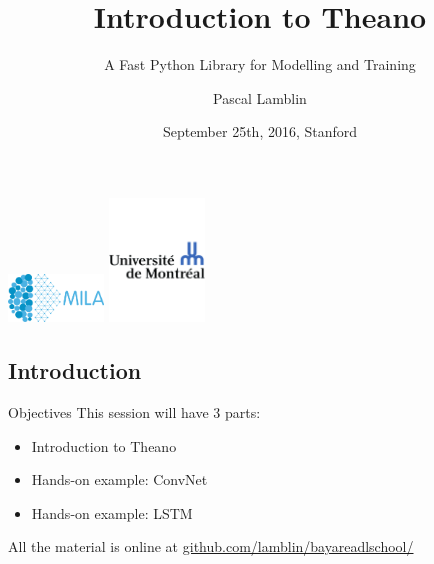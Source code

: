 \documentclass[a4paper,9pt]{beamer}
\title[Intro to Theano]{Introduction to Theano}
\subtitle{A Fast Python Library for Modelling and Training}
\author[MILA]{Pascal Lamblin}
\institute{%
Montreal Institute for Learning Algorithms (MILA)\\
Université de Montréal}
\date{%
September 25th, 2016, Stanford
}
\begin{document}
\begin{frame}[plain]
  \titlepage
  \includegraphics[width=1in]{MILA_official_2016.png}
  \hfill
  \includegraphics[width=1in]{UdeM_logo.pdf}
\end{frame}


\subsection*{Introduction}

\begin{frame}{Objectives}
  This session will have 3 parts:
  \begin{itemize}
    \item Introduction to Theano
    \item Hands-on example: ConvNet
    \item Hands-on example: LSTM
  \end{itemize}
  All the material is online at
  \url{github.com/lamblin/bayareadlschool/}

\end{frame}
\end{document}

